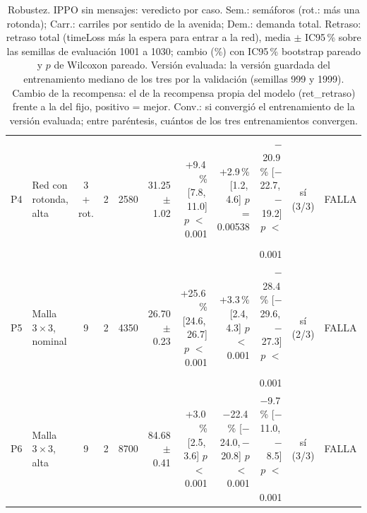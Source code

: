 \begin{table}[H]
\begin{tabular}{llcrrrrrrcl}
P4 & \makecell[l]{Red con\\{}rotonda,\\{}alta} & \makecell[c]{3\\{}+ rot.} & 2 & 2580 & \makecell[r]{31.25\\{}$\pm$ 1.02} & \makecell[r]{+9.4\,\%\\{}[7.8,\,11.0]\\$p$ $<$\,0.001} & \makecell[r]{+2.9\,\%\\{}[1.2,\,4.6]\\$p$ = 0.00538} & \makecell[r]{$-$20.9\,\%\\{}[$-$22.7,\,$-$19.2]\\$p$ $<$\,0.001} & \makecell[c]{sí\\{}(3/3)} & FALLA \\
P5 & \makecell[l]{Malla $3 \times 3$,\\{}nominal} & 9 & 2 & 4350 & \makecell[r]{26.70\\{}$\pm$ 0.23} & \makecell[r]{+25.6\,\%\\{}[24.6,\,26.7]\\$p$ $<$\,0.001} & \makecell[r]{+3.3\,\%\\{}[2.4,\,4.3]\\$p$ $<$\,0.001} & \makecell[r]{$-$28.4\,\%\\{}[$-$29.6,\,$-$27.3]\\$p$ $<$\,0.001} & \makecell[c]{sí\\{}(2/3)} & FALLA \\
P6 & \makecell[l]{Malla $3 \times 3$,\\{}alta} & 9 & 2 & 8700 & \makecell[r]{84.68\\{}$\pm$ 0.41} & \makecell[r]{+3.0\,\%\\{}[2.5,\,3.6]\\$p$ $<$\,0.001} & \makecell[r]{$-$22.4\,\%\\{}[$-$24.0,\,$-$20.8]\\$p$ $<$\,0.001} & \makecell[r]{$-$9.7\,\%\\{}[$-$11.0,\,$-$8.5]\\$p$ $<$\,0.001} & \makecell[c]{sí\\{}(3/3)} & FALLA \\
\bottomrule
\end{tabular}
\caption[Robustez: veredicto de IPPO sin mensajes]{Robustez. IPPO sin mensajes: veredicto por caso. Sem.: semáforos (rot.: más una rotonda); Carr.: carriles por sentido de la avenida; Dem.: demanda total. Retraso: retraso total (timeLoss más la espera para entrar a la red), media $\pm$ IC95\,\% sobre las semillas de evaluación 1001 a 1030; cambio (\%) con IC95\,\% bootstrap pareado y $p$ de Wilcoxon pareado. Versión evaluada: la versión guardada del entrenamiento mediano de los tres por la validación (semillas 999 y 1999). Cambio de la recompensa: el de la recompensa propia del modelo (ret\_retraso) frente a la del fijo, positivo = mejor. Conv.: si convergió el entrenamiento de la versión evaluada; entre paréntesis, cuántos de los tres entrenamientos convergen.}
\label{tab:robustez-veredicto-ippo-local}
\end{table}
